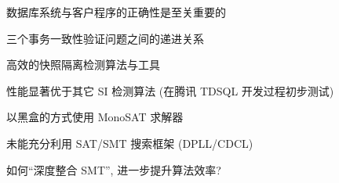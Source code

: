 
\begin{frame}{}
	\begin{center}
		数据库系统与客户程序的正确性是至关重要的


		{\small 三个事务一致性验证问题之间的递进关系}
	\end{center}
\end{frame}

\begin{frame}{}
  \begin{center}
     高效的快照隔离检测算法与工具~

  \end{center}
\end{frame}

\begin{frame}{}
  \begin{center}
  \end{center}
\end{frame}

\begin{frame}{}
	\centerline{性能显著优于其它 SI 检测算法 (在腾讯 TDSQL 开发过程初步测试)}

\end{frame}

\begin{frame}{}
	\begin{center}
		\polysi{} 以黑盒的方式使用 MonoSAT 求解器

		\vspace{0.30cm}
		\vspace{0.30cm}

		未能充分利用 SAT/SMT 搜索框架 (DPLL/CDCL)
	\end{center}
\end{frame}

\begin{frame}{}
	\begin{center}
		 如何``深度整合 SMT'', 进一步提升算法效率?

		\vspace{0.50cm}
	\end{center}
\end{frame}

